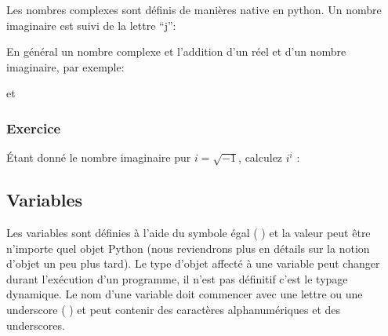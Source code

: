 \documentclass[letterpaper,10pt,english]{sphinxmanual}
\begin{document}
Les nombres complexes sont définis de manières native en python. Un nombre imaginaire est suivi de la lettre “j”:

\begin{sphinxVerbatim}[commandchars=\\\{\}]
\end{sphinxVerbatim}

En général un nombre complexe et l’addition d’un réel et d’un nombre imaginaire, par exemple:

\begin{sphinxVerbatim}[commandchars=\\\{\}]
      
\end{sphinxVerbatim}

et

\begin{sphinxVerbatim}[commandchars=\\\{\}]
      
\end{sphinxVerbatim}


\subsubsection{Exercice}
\label{\detokenize{src/OCI01_Introduction:id1}}
Étant donné le nombre imaginaire pur \(i=\sqrt{-1}\), calculez \(i^i\) :


\subsection{Variables}
\label{\detokenize{src/OCI01_Introduction:variables}}
Les variables sont définies à l’aide du symbole égal ( \sphinxstylestrong{=} ) et la valeur peut être n’importe quel objet Python (nous reviendrons plus en détails sur la notion d’objet un peu plus tard).
Le type d’objet affecté à une variable peut changer durant l’exécution d’un programme, il n’est pas définitif \sphinxhyphen{} c’est le typage dynamique.
Le nom d’une variable doit commencer avec une lettre ou une underscore ( \sphinxstylestrong{\_} ) et peut contenir des caractères alphanumériques et des underscores.

\begin{sphinxVerbatim}[commandchars=\\\{\}]
  
  
    

  
  
\end{sphinxVerbatim}
\end{document}
